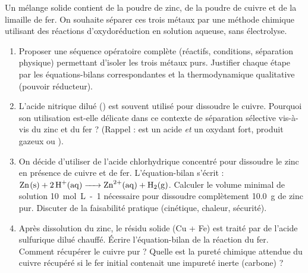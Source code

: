 \documentclass[11pt]{article}
\begin{document}
\begin{exercice}
Un mélange solide contient de la poudre de zinc, de la poudre de cuivre et de la limaille de fer. On souhaite séparer ces trois métaux par une méthode chimique utilisant des réactions d'oxydoréduction en solution aqueuse, sans électrolyse.
\begin{enumerate}
    \item Proposer une séquence opératoire complète (réactifs, conditions, séparation physique) permettant d'isoler les trois métaux purs. Justifier chaque étape par les équations-bilans correspondantes et la thermodynamique qualitative (pouvoir réducteur).
    \item L'acide nitrique dilué () est souvent utilisé pour dissoudre le cuivre. Pourquoi son utilisation est-elle délicate dans ce contexte de séparation sélective vis-à-vis du zinc et du fer ? (Rappel :  est un acide \textit{et} un oxydant fort, produit gazeux  ou ).
    \item On décide d'utiliser de l'acide chlorhydrique concentré pour dissoudre le zinc en présence de cuivre et de fer. L'équation-bilan s'écrit : $\ce{Zn(s) + 2H+(aq) -> Zn^{2+}(aq) + H2(g)}$. Calculer le volume minimal de solution  \SI{10}{mol.L-1} nécessaire pour dissoudre complètement \SI{10,0}{g} de zinc pur. Discuter de la faisabilité pratique (cinétique, chaleur, sécurité).
    \item Après dissolution du zinc, le résidu solide (Cu + Fe) est traité par de l'acide sulfurique dilué chauffé. Écrire l'équation-bilan de la réaction du fer. Comment récupérer le cuivre pur ? Quelle est la pureté chimique attendue du cuivre récupéré si le fer initial contenait une impureté inerte (carbone) ?
\end{enumerate}
\end{exercice}
\end{document}
